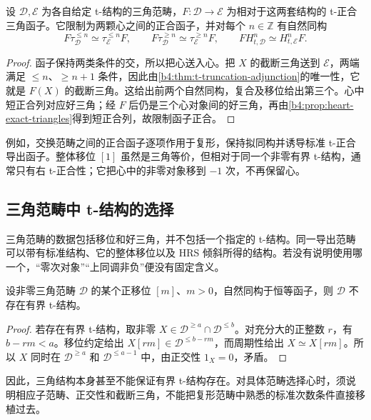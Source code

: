 \begin{proposition}\label{b4:prop:t-exact-heart}
设 \(\mathcal D,\mathcal E\) 为各自给定 t-结构的三角范畴，\(F:\mathcal D\to\mathcal E\) 为相对于这两套结构的 t-正合三角函子。它限制为两颗心之间的正合函子，并对每个 \(n\in\mathbb Z\) 有自然同构
\[
 F\tau_{\mathcal D}^{\le n}\simeq\tau_{\mathcal E}^{\le n}F,
 \qquad F\tau_{\mathcal D}^{\ge n}\simeq\tau_{\mathcal E}^{\ge n}F,
 \qquad F H_{t,\mathcal D}^n\simeq H_{t,\mathcal E}^nF.
\]
\end{proposition}
\begin{proof}
函子保持两类条件的交，所以把心送入心。把 \(X\) 的截断三角送到 \(\mathcal E\)，两端满足 \(\le n\)、\(\ge n+1\) 条件，因此由\cref{b4:thm:t-truncation-adjunction}的唯一性，它就是 \(F(X)\) 的截断三角。这给出前两个自然同构，复合及移位给出第三个。心中短正合列对应好三角；经 \(F\) 后仍是三个心对象间的好三角，再由\cref{b4:prop:heart-exact-triangles}得到短正合列，故限制函子正合。
\end{proof}

例如，交换范畴之间的正合函子逐项作用于复形，保持拟同构并诱导标准 t-正合导出函子。整体移位 \([1]\) 虽然是三角等价，但相对于同一个非零有界 t-结构，通常只有右 t-正合性；它把心中的非零对象移到 \(-1\) 次，不再保留心。

\subsection{三角范畴中 t-结构的选择}
\label{b4:subsec:1906:03}

三角范畴的数据包括移位和好三角，并不包括一个指定的 t-结构。同一导出范畴可以带有标准结构、它的整体移位以及 HRS 倾斜所得的结构。若没有说明使用哪一个，“零次对象”“上同调非负”便没有固定含义。

\begin{proposition}\label{b4:prop:periodic-no-bounded-t}
设非零三角范畴 \(\mathcal D\) 的某个正移位 \([m]\)、\(m>0\)，自然同构于恒等函子，则 \(\mathcal D\) 不存在有界 t-结构。
\end{proposition}
\begin{proof}
若存在有界 t-结构，取非零 \(X\in\mathcal D^{\ge a}\cap\mathcal D^{\le b}\)。对充分大的正整数 \(r\)，有 \(b-rm<a\)。移位约定给出 \(X[rm]\in\mathcal D^{\le b-rm}\)，而周期性给出 \(X\simeq X[rm]\)。所以 \(X\) 同时在 \(\mathcal D^{\ge a}\) 和 \(\mathcal D^{\le a-1}\) 中，由正交性 \(1_X=0\)，矛盾。
\end{proof}

因此，三角结构本身甚至不能保证有界 t-结构存在。对具体范畴选择心时，须说明相应子范畴、正交性和截断三角，不能把复形范畴中熟悉的标准次数条件直接移植过去。

